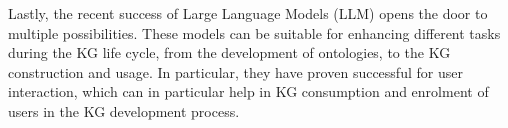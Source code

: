 Lastly, the recent success of Large Language Models (LLM) opens the door to multiple possibilities. These models can be suitable for enhancing different tasks during the KG life cycle, from the development of ontologies, to the KG construction and usage. In particular, they have proven successful for user interaction, which can in particular help in KG consumption and enrolment of users in the KG development process.



